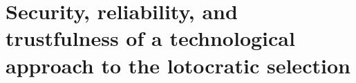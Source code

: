 \section{Security, reliability, and trustfulness of a technological approach to the lotocratic selection}\label{sec:conclusion}



